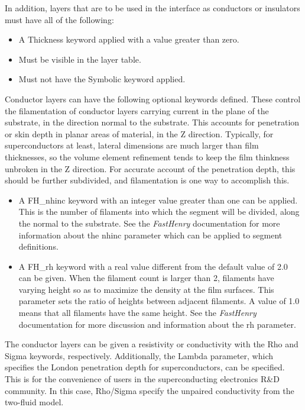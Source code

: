 In addition, layers that are to be used in the interface as conductors
or insulators must have all of the following:

\begin{itemize}
\item{A {\et Thickness} keyword applied with a value greater than
zero.}

\item{Must be visible in the layer table.}

\item{Must not have the {\et Symbolic} keyword applied.}
\end{itemize}

Conductor layers can have the following optional keywords defined. 
These control the filamentation of conductor layers carrying current
in the plane of the substrate, in the direction normal to the
substrate.  This accounts for penetration or skin depth in planar
areas of material, in the Z direction.  Typically, for superconductors
at least, lateral dimensions are much larger than film thicknesses, so
the volume element refinement tends to keep the film thinkness
unbroken in the Z direction.  For accurate account of the penetration
depth, this should be further subdivided, and filamentation is one way
to accomplish this.

\begin{itemize}
\item{A {\et FH\_nhinc} keyword with an integer value greater than one
can be applied.  This is the number of filaments into which the
segment will be divided, along the normal to the substrate.  See the
{\it FastHenry} documentation for more information about the {\vt
nhinc} parameter which can be applied to segment definitions.}

\item{A {\et FH\_rh} keyword with a real value different from the
default value of 2.0 can be given.  When the filament count is larger
than 2, filaments have varying height so as to maximize the density at
the film surfaces.  This parameter sets the ratio of heights between
adjacent filaments.  A value of 1.0 means that all filaments have the
same height.  See the {\it FastHenry} documentation for more
discussion and information about the {\vt rh} parameter.}
\end{itemize}

The conductor layers can be given a resistivity or conductivity with
the {\et Rho} and {\et Sigma} keywords, respectively.  Additionally,
the {\et Lambda} parameter, which specifies the London penetration
depth for superconductors, can be specified.  This is for the
convenience of {\Xic} users in the superconducting electronics R\&D
community.  In this case, {\et Rho}/{\et Sigma} specify the unpaired
conductivity from the two-fluid model.


